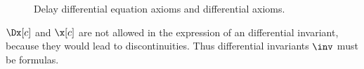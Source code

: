 \begin{figure}[h]
\begin{calculuscollections}{\coloumnwidth}
\begin{calculus}
            \end{calculus}
            \end{calculuscollections}
            \caption{Delay differential equation axioms and differential axioms.}
            \label{fig:D-axioms}
        \end{figure}

        $\Dx[c]$ and $\x[c]$ are not allowed in the expression of an differential invariant, because they would lead to discontinuities. Thus differential invariants $\inv$ must be \FOLR formulas.


